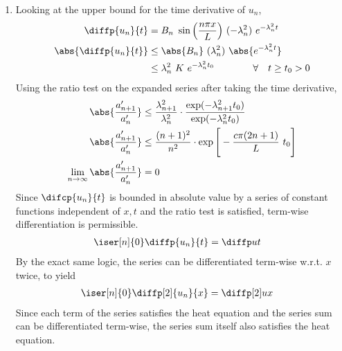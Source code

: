 \begin{enumerate}
    \item Looking at the upper bound for the time derivative of $ u_n $,
          \begin{align}
              \diffp {u_n}{t}      & = B_n\ \sin\Big(
              \frac{n\pi x}{L}\Big)\ (-\lambda_n^2)\ e^{-\lambda_n^2 t}        \\
              \abs{\diffp{u_n}{t}} & \leq \abs{B_n}\ (\lambda_n^2)
              \ \abs{e^{-\lambda_n^2 t}}                                       \\
                                   & \leq \lambda_n^2\ K\ e^{-\lambda_n^2 t_0}
              \qquad\qquad \forall \quad t \geq t_0 > 0
          \end{align}
          Using the ratio test on the expanded series after taking the time derivative,
          \begin{align}
              \abs{\frac{a'_{n+1}}{a'_{n}}} & \leq \frac{\lambda_{n+1}^2}{\lambda_n^2}
              \cdot \frac{\exp(-\lambda_{n+1}^2 t_0)}{\exp(-\lambda_n^2 t_0)}          \\
              \abs{\frac{a'_{n+1}}{a'_{n}}} & \leq \frac{(n+1)^2}{n^2}
              \cdot \exp \Bigg[ -\frac{c\pi(2n + 1)}{L}\ t_0 \Bigg]                    \\
              \lim_{n \to \infty} \abs{\frac{a'_{n+1}}
              {a'_{n}}}                     & = 0
          \end{align}
          Since $ \difcp{u_n}{t} $ is bounded in absolute value by a series of constant
          functions independent of $ x, t $ and the ratio test is satisfied, term-wise
          differentiation is permissible.
          \begin{align}
              \iser[n]{0} \diffp{u_n}{t} & = \diffp ut
          \end{align}
          By the exact same logic, the series can be differentiated term-wise w.r.t.
          $ x $ twice, to yield
          \begin{align}
              \iser[n]{0} \diffp[2] {u_n}{x} & = \diffp[2] ux
          \end{align}
          Since each term of the series satisfies the heat equation and the series sum
          can be differentiated term-wise, the series sum itself also satisfies the
          heat equation.

\end{enumerate}